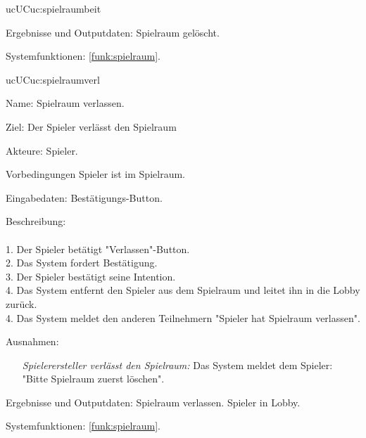\begin{description}[leftmargin=5em, style=sameline]
\begin{lhp}{uc}{UC}{uc:spielraumbeit}
\begin{itemize}
			\end{itemize}
		\item [Ergebnisse und Outputdaten:] Spielraum gelöscht. 	
		\item [Systemfunktionen:] \ref{funk:spielraum}.
	\end{lhp}

	\begin{lhp}{uc}{UC}{uc:spielraumverl}
		\item [Name:] Spielraum verlassen.
		\item [Ziel:] Der Spieler verlässt den Spielraum
		\item [Akteure:] Spieler.
		\item [Vorbedingungen] Spieler ist im Spielraum.
		\item [Eingabedaten:] Bestätigungs-Button.
		\item [Beschreibung:] \hfill\\ \hfill\\
			1. Der Spieler betätigt "{}Verlassen{}"{}-Button.\\
			2. Das System fordert Bestätigung.\\
			3. Der Spieler bestätigt seine Intention.\\
			4. Das System entfernt den Spieler aus dem Spielraum und leitet ihn in die Lobby zurück.\\	
			4. Das System meldet den anderen Teilnehmern "{}Spieler hat Spielraum verlassen{}"{}.	
		\item [Ausnahmen:] \hfill
			\begin{itemize} 
				\item[] \textit{Spielerersteller verlässt den Spielraum:} Das System meldet dem Spieler: "{}Bitte Spielraum zuerst löschen{}"{}.
					
			\end{itemize}
		\item [Ergebnisse und Outputdaten:] Spielraum verlassen. Spieler in Lobby.	
		\item [Systemfunktionen:] \ref{funk:spielraum}.
	\end{lhp}	
	


\end{description}
